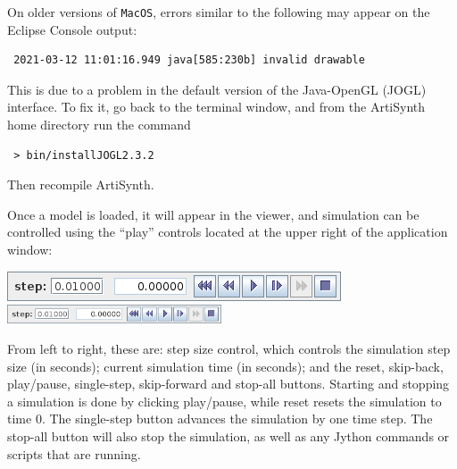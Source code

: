 \iflatexml\else\pagebreak\fi

\ifMacOS
\begin{sideblock}
On older versions of {\tt MacOS}, errors similar to the following
may appear on the Eclipse Console output:
\begin{verbatim}
 2021-03-12 11:01:16.949 java[585:230b] invalid drawable 
\end{verbatim}
This is due to a problem in the default version of the Java-OpenGL
(JOGL) interface. To fix it, go back to the terminal window, and
from the ArtiSynth home directory run the command
\begin{verbatim}
 > bin/installJOGL2.3.2
\end{verbatim}
Then recompile ArtiSynth.
\end{sideblock}
\fi

Once a model is loaded, it will appear in the viewer, and simulation
can be controlled using the ``play'' controls located at the upper right
of the application window:

\begin{center}
\iflatexml
  \includegraphics[]{../uiguide/images/playControls}
\else
  \includegraphics[width=2.5in]{../uiguide/images/playControls}
\fi
\end{center}

From left to right, these are: step size control, which controls the
simulation step size (in seconds); current simulation time (in
seconds); and the {\sf reset}, {\sf skip-back}, {\sf play/pause}, {\sf
single-step}, {\sf skip-forward} and {\sf stop-all} buttons.  Starting
and stopping a simulation is done by clicking {\sf play/pause}, while
{\sf reset} resets the simulation to time 0.  The {\sf single-step}
button advances the simulation by one time step. The {\sf stop-all}
button will also stop the simulation, as well as any Jython commands
or scripts that are running.

\ifMacOS

